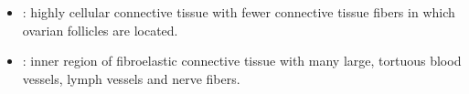 \begin{multicols}{2}
\begin{itemize}
  
  \item {}: highly cellular connective tissue with fewer connective tissue fibers in which ovarian follicles are located. 
  
  \begin{center}
  \end{center}
  
  \item {}: inner region of fibroelastic connective tissue with many large, tortuous blood vessels, lymph vessels and nerve fibers. 
  
  \begin{center}
  \end{center}
  
\end{itemize}
\end{multicols}

